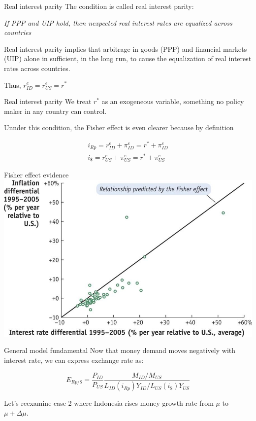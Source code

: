 \documentclass[
  ignorenonframetext,
]{beamer}
\begin{document}
\begin{frame}{Real interest parity}
\label{real-interest-parity-1}
The condition is called real interest parity:

\emph{If PPP and UIP hold, then nexpected real interest rates are
equalized across countries}

Real interest parity implies that arbitrage in goods (PPP) and financial
markets (UIP) alone in sufficient, in the long run, to cause the
equalization of real interest rates across countries.

Thus, \(r^e_{ID}=r^e_{US}=r^*\)
\end{frame}

\begin{frame}{Real interest parity}
\label{real-interest-parity-2}
We treat \(r^*\) as an exogeneous variable, something no policy maker in
any country can control.

Unnder this condition, the Fisher effect is even clearer because by
definition

\begin{align*}
i_{Rp}=r^e_{ID}+\pi^e_{ID} = r^*+\pi^e_{ID} \\
i_{\$}=r^e_{US}+\pi^e_{US} = r^*+\pi^e_{US}
\end{align*}
\end{frame}

\begin{frame}{Fisher effect evidence}
\label{fisher-effect-evidence}
\includegraphics{Picture6.jpg}
\end{frame}

\begin{frame}{General model fundamental}
\label{general-model-fundamental}
Now that money demand moves negatively with interest rate, we can
express exchange rate as:

\begin{equation}
E_{Rp/\$}=\frac{P_{ID}}{P_{US}}\frac{M_{ID}/M_{US}}{L_{ID}(i_{Rp})Y_{ID}/L_{US}(i_\$)Y_{US}}
\end{equation}

Let's reexamine case 2 where Indonesia rises money growth rate from
\(\mu\) to \(\mu+\Delta\mu\).
\end{frame}
\end{document}
